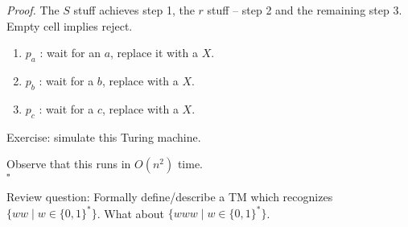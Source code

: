 \documentclass[a4paper]{article}
\newenvironment{proof}{\begin{breakbox}\textit{Proof.}}{\hfill$\square$\end{breakbox}}
\newcommand{\nl}{\vspace{0.2cm}\\}
\begin{document}
\begin{proof}
The $S$ stuff achieves step 1, the $r$ stuff -- step 2 and the remaining step 3. Empty cell implies reject.
\begin{enumerate}
    \item $p_a$ : wait for an $a$, replace it with a $X$.
    \item $p_b$ : wait for a $b$, replace with a $X$.
    \item $p_c$ : wait for a $c$, replace with a $X$.
\end{enumerate}
Exercise: simulate this Turing machine.

Observe that this runs in $O(n^2)$ time.\nl
\end{proof}

Review question: Formally define/describe a TM which recognizes $\{ww \mid w \in \{0, 1\}^*\}$. What about $\{www \mid w \in \{0, 1\}^*\}$.
\end{document}
